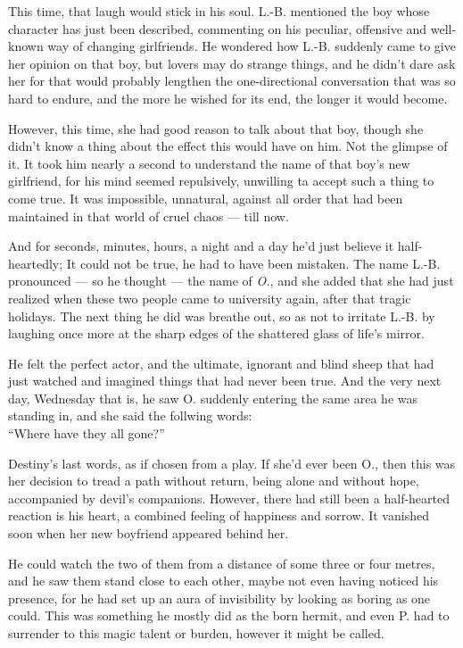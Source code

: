 This time, that laugh would stick in his soul. L.-B. mentioned the boy whose character has just been described, commenting on his peculiar, offensive and well-known way of changing girlfriends. He wondered how L.-B. suddenly came to give her opinion on that boy, but lovers may do strange things, and he didn't dare ask her for that would probably lengthen the one-directional conversation that was so hard to endure, and the more he wished for its end, the longer it would become.

However, this time, she had good reason to talk about that boy, though she didn't know a thing about the effect this would have on him. Not the glimpse of it. 
It took him nearly a second to understand the name of that boy's new girlfriend, for his mind seemed repulsively, unwilling ta accept such a thing to come true. 
It was impossible, unnatural, against all order that had been maintained in that world of cruel chaos --- till now.

And for seconds, minutes, hours, a night and a day he'd just believe it half-heartedly; It could not be true, he had to have been mistaken. 
The name L.-B. pronounced --- so he thought --- the name of \emph{O.}, and she added that she had just realized when these two people came to university again, after that tragic holidays. 
The next thing he did was breathe out, so as not to irritate L.-B. by laughing once more at the sharp edges of the shattered glass of life's mirror.

He felt the perfect actor, and the ultimate, ignorant and blind sheep that had just watched and imagined things that had never been true. And the very next day, Wednesday that is, he saw O. suddenly entering the same area he was standing in, and she said the follwing words:\\
\enquote{Where have they all gone?}

Destiny's last words, as if chosen from a play. If she'd ever been O., then this was her decision to tread a path without return, being alone and without hope, accompanied by devil's companions. 
However, there had still been a half-hearted reaction is his heart, a combined feeling of happiness and sorrow. It vanished soon when her new boyfriend appeared behind her.

He could watch the two of them from a distance of some three or four metres, and he saw them stand close to each other, maybe not even having noticed his presence, for he had set up an aura of invisibility by looking as boring as one could. This was something he mostly did as the born hermit, and even P. had to surrender to this magic talent or burden, however it might be called.

